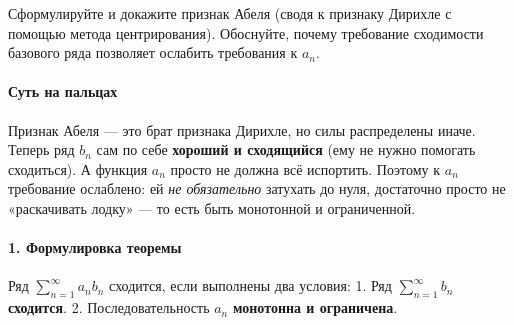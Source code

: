 {Сформулируйте и докажите признак Абеля (сводя к признаку Дирихле с помощью метода центрирования). Обоснуйте, почему требование сходимости базового ряда позволяет ослабить требования к $a_n$.}

\paragraph{Суть на пальцах}
Признак Абеля — это брат признака Дирихле, но силы распределены иначе. Теперь ряд $b_n$ сам по себе \textbf{хороший и сходящийся} (ему не нужно помогать сходиться). А функция $a_n$ просто не должна всё испортить. Поэтому к $a_n$ требование ослаблено: ей \textit{не обязательно} затухать до нуля, достаточно просто не «раскачивать лодку» — то есть быть монотонной и ограниченной. 

\paragraph{1. Формулировка теоремы}
Ряд $\sum_{n=1}^{\infty} a_n b_n$ сходится, если выполнены два условия:
1. Ряд $\sum_{n=1}^{\infty} b_n$ \textbf{сходится}.
2. Последовательность $a_n$ \textbf{монотонна и ограничена}.


